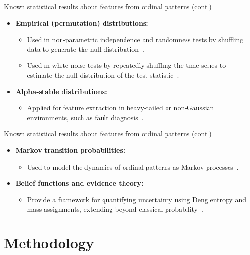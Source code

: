 \documentclass{beamer}
\begin{document}
\begin{frame}{Known statistical results about features from ordinal patterns (cont.)}
	\begin{itemize}
		\item \textbf{Empirical (permutation) distributions:}
		\begin{itemize}
			\item Used in non-parametric independence and randomness tests by shuffling data to generate the null distribution~\cite{MatillaGarcia2008, AshtariNezhad2019}.
			\item Used in white noise tests by repeatedly shuffling the time series to estimate the null distribution of the test statistic~\cite{Chagas2022a}.
		\end{itemize}
		\item \textbf{Alpha-stable distributions:}
		\begin{itemize}
			\item Applied for feature extraction in heavy-tailed or non-Gaussian environments, such as fault diagnosis~\cite{Chouri2014}.
		\end{itemize}
	\end{itemize}
\end{frame}

\begin{frame}{Known statistical results about features from ordinal patterns (cont.)}
	\begin{itemize}
		\item \textbf{Markov transition probabilities:}
		\begin{itemize}
			\item Used to model the dynamics of ordinal patterns as Markov processes~\cite{Sakellariou2019}.
		\end{itemize}
		\item \textbf{Belief functions and evidence theory:}
		\begin{itemize}
			\item Provide a framework for quantifying uncertainty using Deng entropy and mass assignments, extending beyond classical probability~\cite{Xie2025}.
		\end{itemize}
	\end{itemize}
\end{frame}


\section{Methodology}
\end{document}
